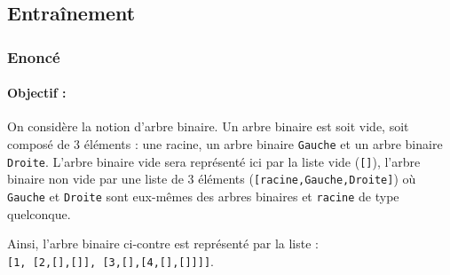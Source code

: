 \subsection{Entraînement}

\subsubsection{Enoncé}\label{f2f3}
\paragraph{Objectif :} On considère la notion d'arbre binaire. Un arbre binaire
est soit vide, soit composé de 3 éléments :
une racine, un arbre binaire \texttt{Gauche} et un arbre binaire \texttt{Droite}.
L'arbre binaire vide sera représenté ici par la liste vide (\texttt{[]}), l'arbre binaire
non vide par une liste de 3 éléments (\texttt{[racine,Gauche,Droite]}) où \texttt{Gauche}
et \texttt{Droite} sont eux-mêmes des arbres binaires et \texttt{racine} de type quelconque.


\noindent \begin{minipage}{11cm}
Ainsi, l'arbre binaire ci-contre
est représenté par la liste :\\
\texttt{[1, [2,[],[]], [3,[],[4,[],[]]]]}.
\end{minipage}
\hfill
\begin{minipage}{4cm}
\end{minipage}
\vspace*{3mm}

